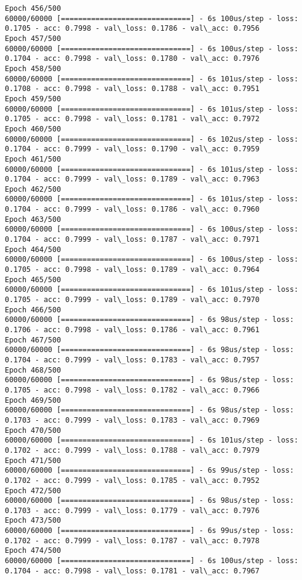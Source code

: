 \documentclass[11pt]{article}
\begin{document}
\begin{Verbatim}[commandchars=\\\{\}]
Epoch 456/500
60000/60000 [==============================] - 6s 100us/step - loss: 0.1705 - acc: 0.7998 - val\_loss: 0.1786 - val\_acc: 0.7956
Epoch 457/500
60000/60000 [==============================] - 6s 100us/step - loss: 0.1704 - acc: 0.7998 - val\_loss: 0.1780 - val\_acc: 0.7976
Epoch 458/500
60000/60000 [==============================] - 6s 101us/step - loss: 0.1708 - acc: 0.7998 - val\_loss: 0.1788 - val\_acc: 0.7951
Epoch 459/500
60000/60000 [==============================] - 6s 101us/step - loss: 0.1705 - acc: 0.7998 - val\_loss: 0.1781 - val\_acc: 0.7972
Epoch 460/500
60000/60000 [==============================] - 6s 102us/step - loss: 0.1704 - acc: 0.7999 - val\_loss: 0.1790 - val\_acc: 0.7959
Epoch 461/500
60000/60000 [==============================] - 6s 101us/step - loss: 0.1704 - acc: 0.7999 - val\_loss: 0.1789 - val\_acc: 0.7963
Epoch 462/500
60000/60000 [==============================] - 6s 101us/step - loss: 0.1704 - acc: 0.7999 - val\_loss: 0.1786 - val\_acc: 0.7960
Epoch 463/500
60000/60000 [==============================] - 6s 100us/step - loss: 0.1704 - acc: 0.7999 - val\_loss: 0.1787 - val\_acc: 0.7971
Epoch 464/500
60000/60000 [==============================] - 6s 100us/step - loss: 0.1705 - acc: 0.7998 - val\_loss: 0.1789 - val\_acc: 0.7964
Epoch 465/500
60000/60000 [==============================] - 6s 101us/step - loss: 0.1705 - acc: 0.7999 - val\_loss: 0.1789 - val\_acc: 0.7970
Epoch 466/500
60000/60000 [==============================] - 6s 98us/step - loss: 0.1706 - acc: 0.7998 - val\_loss: 0.1786 - val\_acc: 0.7961
Epoch 467/500
60000/60000 [==============================] - 6s 98us/step - loss: 0.1704 - acc: 0.7999 - val\_loss: 0.1783 - val\_acc: 0.7957
Epoch 468/500
60000/60000 [==============================] - 6s 98us/step - loss: 0.1705 - acc: 0.7998 - val\_loss: 0.1782 - val\_acc: 0.7966
Epoch 469/500
60000/60000 [==============================] - 6s 98us/step - loss: 0.1703 - acc: 0.7999 - val\_loss: 0.1783 - val\_acc: 0.7969
Epoch 470/500
60000/60000 [==============================] - 6s 101us/step - loss: 0.1702 - acc: 0.7999 - val\_loss: 0.1788 - val\_acc: 0.7979
Epoch 471/500
60000/60000 [==============================] - 6s 99us/step - loss: 0.1702 - acc: 0.7999 - val\_loss: 0.1785 - val\_acc: 0.7952
Epoch 472/500
60000/60000 [==============================] - 6s 98us/step - loss: 0.1703 - acc: 0.7999 - val\_loss: 0.1779 - val\_acc: 0.7976
Epoch 473/500
60000/60000 [==============================] - 6s 99us/step - loss: 0.1702 - acc: 0.7999 - val\_loss: 0.1787 - val\_acc: 0.7978
Epoch 474/500
60000/60000 [==============================] - 6s 100us/step - loss: 0.1704 - acc: 0.7998 - val\_loss: 0.1781 - val\_acc: 0.7967

\end{Verbatim}
\end{document}
